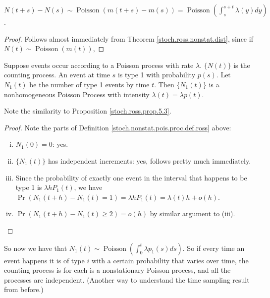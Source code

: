 \begin{corollary} \(N(t+s) - N(s) \sim \operatorname{Poisson}(m(t+s) - m(s)) = \operatorname{Poisson}(\int_s^{s+t} \lambda(y) dy ) \).

\end{corollary}

\begin{proof} Follows almost immediately from Theorem \ref{stoch.ross.nonstat.dist}, since if \(N(t) \sim \operatorname{Poisson}(m(t))\), 

\end{proof}

\begin{proposition} Suppose events occur according to a Poisson process with rate \(\lambda\). \(\{N(t)\}\) is the counting process. An event at time \(s\) is type 1 with probability \(p(s)\). Let \(N_1(t)\) be the number of type 1 events by time \(t\). Then \(\{N_1(t)\}\) is a nonhomogeneous Poisson Process with intensity \(\lambda(t) = \lambda p(t)\). 

\end{proposition}

\begin{remark}Note the similarity to Proposition \ref{stoch.ross.prop.5.3}. \end{remark}

\begin{proof} Note the parts of Definition \ref{stoch.nonstat.pois.proc.def.ross} above:

\begin{enumerate}[(i)]

\item \(N_1(0)= 0\): yes.

\item \(\{N_1(t)\}\) has independent increments: yes, follows pretty much immediately.

\item Since the probability of exactly one event in the interval that happens to be type 1 is \( \lambda h P_1(t)\), we have \(\Pr(N_1(t+h) -N_1(t) = 1) = \lambda h P_1(t) = \lambda(t) h + o(h) \).

\item \(\Pr(N_1(t+h) -N_1(t) \geq 2) =  o(h) \) by similar argument to (iii).

\end{enumerate}

\end{proof}

So now we have that \(N_1(t) \sim \operatorname{Poisson}( \int_0^t \lambda p_1(s) ds)\). So if every time an event happens it is of type \(i\) with a certain probability that varies over time, the counting process is for each is a nonstationary Poisson process, and all the processes are independent. (Another way to understand the time sampling result from before.)

